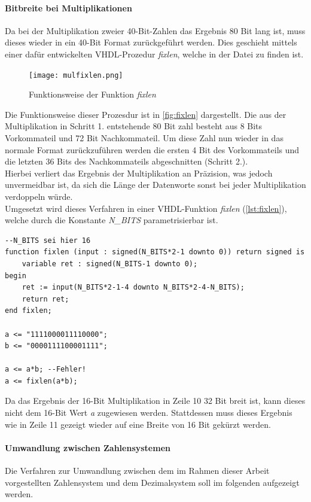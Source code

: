 \documentclass[a4paper,12pt,onesided]{report}
\begin{document}
\paragraph{Bitbreite bei Multiplikationen}
Da bei der Multiplikation zweier 40-Bit-Zahlen das Ergebnis 80 Bit lang ist, muss dieses wieder in ein 40-Bit Format zurückgeführt werden.
Dies geschieht mittels einer dafür entwickelten VHDL-Prozedur \textit{fixlen}, welche in der Datei %
zu finden ist.

\begin{figure}[H]
	\centering
	\texttt{[image: mulfixlen.png]}
	\caption{Funktionsweise der Funktion \textit{fixlen}}
	\label{fig:fixlen}
\end{figure}

Die Funktionsweise dieser Prozesdur ist in \autoref{fig:fixlen} dargestellt.
Die aus der Multiplikation in Schritt 1. entstehende 80 Bit zahl besteht aus 8 Bits Vorkommateil und 72 Bit Nachkommateil.
Um diese Zahl nun wieder in das normale Format zurückzuführen werden die ersten 4 Bit des Vorkommateils und die letzten 36 Bits des Nachkommateils abgeschnitten (Schritt 2.).\\
Hierbei verliert das Ergebnis der Multiplikation an Präzision, was jedoch unvermeidbar ist, da sich die Länge der Datenworte sonst bei jeder Multiplikation verdoppeln würde.\\
Umgesetzt wird dieses Verfahren in einer VHDL-Funktion \textit{fixlen} (\autoref{lst:fixlen}), welche durch die Konstante \textit{N\_BITS} parametrisierbar ist.
\begin{lstlisting}[label=lst:fixlen,caption=VHDL-Funktion \textit{fixlen}]
--N_BITS sei hier 16
function fixlen (input : signed(N_BITS*2-1 downto 0)) return signed is
	variable ret : signed(N_BITS-1 downto 0);
begin
	ret := input(N_BITS*2-1-4 downto N_BITS*2-4-N_BITS);
	return ret;
end fixlen;

a <= "1111000011110000";
b <= "0000111100001111";

a <= a*b; --Fehler!
a <= fixlen(a*b);
\end{lstlisting}
Da das Ergebnis der 16-Bit Multiplikation in Zeile 10 32 Bit breit ist, kann dieses nicht dem 16-Bit Wert \textit{a} zugewiesen werden.
Stattdessen muss dieses Ergebnis wie in Zeile 11 gezeigt wieder auf eine Breite von 16 Bit gekürzt werden.

\paragraph{Umwandlung zwischen Zahlensystemen}
Die Verfahren zur Umwandlung zwischen dem im Rahmen dieser Arbeit vorgestellten Zahlensystem und dem Dezimalsystem soll im folgenden aufgezeigt werden.
\end{document}
